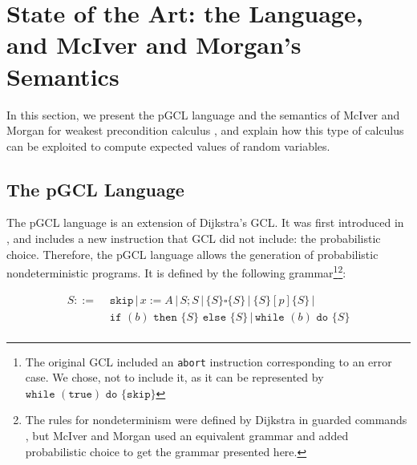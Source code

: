 \documentclass[a4paper,10pt]{llncs}
\begin{document}
	
\section{State of the Art: the Language, and McIver and Morgan's Semantics}
\label{sec:state}
In this section, we present the pGCL language and the semantics of McIver and Morgan for weakest precondition calculus \cite{McIver05}, and explain how this type of calculus can be exploited to compute expected values of random variables.

	\subsection{The pGCL Language}
	The pGCL language is an extension of Dijkstra's GCL. It was first introduced in \cite{McIver05}, and includes a new instruction that GCL did not include: the probabilistic choice. Therefore, the pGCL language allows the generation of probabilistic nondeterministic programs. It is defined by the following grammar\footnote{The original GCL included an \texttt{abort} instruction corresponding to an error case. We chose, not to include it, as it can be represented by $\texttt{while } (\texttt{true}) \texttt{ do }\{ \texttt{skip} \}$}\footnote{The rules for nondeterminism were defined by Dijkstra in guarded commands \cite{Dijkstra76}, but McIver and Morgan used an equivalent grammar and added probabilistic choice to get the grammar presented here. }:


\begin{align*}
 S ::= & \texttt{ skip} \,|\, x := A \,|\, S;S  \,|\, \{S\} \square \{S\} \,|\ \{S\} [p] \{S\} \,|\ \\
 & \texttt{ if } (b) \texttt{ then } \{ S \} \texttt{ else } \{ S \} \,|\, \texttt{while }(b) \texttt{ do }\{S\} \\
\end{align*}
\end{document}

